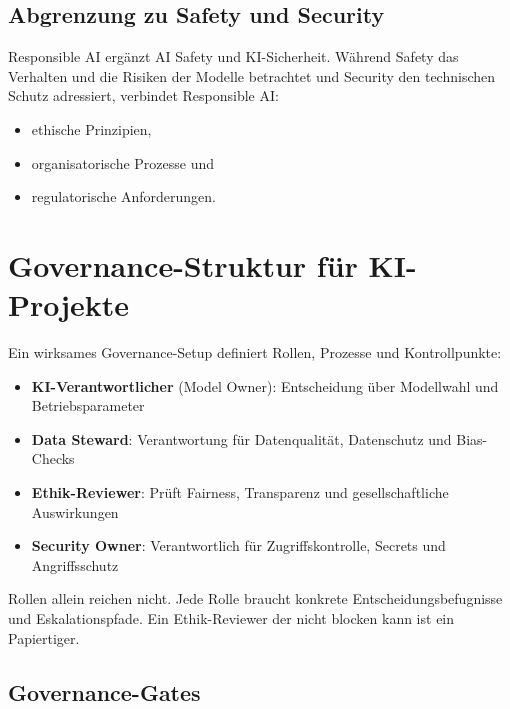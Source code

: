 \subsection{Abgrenzung zu Safety und Security}

Responsible AI ergänzt AI Safety und KI-Sicherheit. Während Safety das Verhalten und die Risiken der Modelle betrachtet und Security den technischen Schutz adressiert, verbindet Responsible AI:

\begin{itemize}[leftmargin=*]
    \item ethische Prinzipien,
    \item organisatorische Prozesse und
    \item regulatorische Anforderungen.
\end{itemize}

\section{Governance-Struktur für KI-Projekte}

Ein wirksames Governance-Setup definiert Rollen, Prozesse und Kontrollpunkte:

\begin{itemize}[leftmargin=*]
    \item \textbf{KI-Verantwortlicher} (Model Owner): Entscheidung über Modellwahl und Betriebsparameter
    \item \textbf{Data Steward}: Verantwortung für Datenqualität, Datenschutz und Bias-Checks
    \item \textbf{Ethik-Reviewer}: Prüft Fairness, Transparenz und gesellschaftliche Auswirkungen
    \item \textbf{Security Owner}: Verantwortlich für Zugriffskontrolle, Secrets und Angriffsschutz
\end{itemize}

\begin{praxishinweis}
Rollen allein reichen nicht. Jede Rolle braucht konkrete Entscheidungsbefugnisse und Eskalationspfade. Ein Ethik-Reviewer der nicht blocken kann ist ein Papiertiger.
\end{praxishinweis}

\subsection{Governance-Gates}

